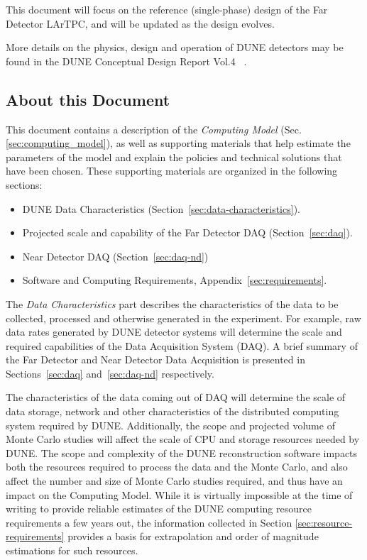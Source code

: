 This document will focus on the reference (single-phase) design of the Far Detector LArTPC, and will be updated
as the design evolves.

More details on the physics, design and operation of DUNE detectors 
may be found in the DUNE Conceptual Design Report Vol.4 ~\cite{cdr_vol4_docdb}. 


\subsection{About this Document}
\label{sec:modelrole}

This document contains a description of the \textit{Computing Model} (Sec.\ref{sec:computing_model}),
as well as supporting materials that help estimate the parameters of the model and
explain the policies and technical solutions that have been chosen.  These supporting materials are
organized in the following sections:

\begin{itemize}
\item DUNE Data Characteristics (Section~\ref{sec:data-characteristics}).
\item Projected scale and capability of the Far Detector DAQ (Section~\ref{sec:daq}).
\item Near Detector DAQ (Section~\ref{sec:daq-nd})
\item Software and Computing Requirements, Appendix~\ref{sec:requirements}.
\end{itemize}

\noindent
The \textit{Data Characteristics} part describes the characteristics of the data to be collected, processed and otherwise generated in the experiment.
For example, raw data rates generated by DUNE detector systems will determine the scale and required capabilities of the Data
Acquisition System (DAQ).  A brief summary of the Far Detector and Near Detector Data Acquisition is presented in Sections~\ref{sec:daq}
and~\ref{sec:daq-nd} respectively.

The characteristics of the data coming out of DAQ will determine the scale of data storage, network
and other characteristics of the distributed computing system required by DUNE.  Additionally, the scope and projected
volume of Monte Carlo studies  will affect the scale of CPU and storage resources needed by DUNE.  The scope and complexity of the DUNE
reconstruction software impacts both the resources required to process the data and the Monte Carlo, and also affect the
number and size of Monte Carlo studies required, and thus have an impact on the Computing Model. While it is virtually
impossible at the time of writing to provide reliable estimates of the DUNE computing resource requirements a few years out,
the information collected in Section \ref{sec:resource-requirements} provides a basis for extrapolation and order of magnitude
estimations for such resources.


